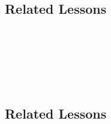\subsection{Related Lessons}
\fourfOne{}\\
\fourhThree{}\\
\fourhFour{}\\
\fourkThree{}\\
\fourkFour{}\\
%
\subsection{Related Lessons}
\fourbOne{}\\
\fourFKFourtySeven{}\\
\fourgOne{}\\
\fourhOne{}\\
\fouriOne{}\\
\fouriFive{}\\
\fouriSix{}\\
\fourjOne{}\\
\fourkFive{}\\
\fourkSeven{}\\
